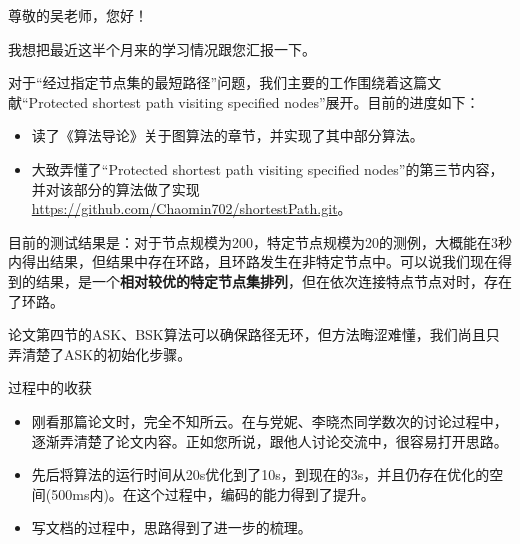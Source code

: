 \documentclass[UTF8]{ctexart}
\begin{document}
\par 尊敬的吴老师，您好！
\newline
\par 我想把最近这半个月来的学习情况跟您汇报一下。
\par 对于“经过指定节点集的最短路径”问题，我们主要的工作围绕着这篇文献“Protected shortest path visiting specified nodes”展开。目前的进度如下：
\begin{itemize}
\item 读了《算法导论》关于图算法的章节，并实现了其中部分算法。
\item 大致弄懂了“Protected shortest path visiting specified nodes”的第三节内容，并对该部分的算法做了实现
\url{https://github.com/Chaomin702/shortestPath.git}。
\end{itemize}
\par 目前的测试结果是：对于节点规模为200，特定节点规模为20的测例，大概能在3秒内得出结果，但结果中存在环路，且环路发生在非特定节点中。可以说我们现在得到的结果，是一个\textbf{相对较优的特定节点集排列}，但在依次连接特点节点对时，存在了环路。
\par 论文第四节的ASK、BSK算法可以确保路径无环，但方法晦涩难懂，我们尚且只弄清楚了ASK的初始化步骤。
\newline
\par 过程中的收获
\begin{itemize}
\item 刚看那篇论文时，完全不知所云。在与党妮、李晓杰同学数次的讨论过程中，逐渐弄清楚了论文内容。正如您所说，跟他人讨论交流中，很容易打开思路。
\item 先后将算法的运行时间从20s优化到了10s，到现在的3s，并且仍存在优化的空间(500ms内)。在这个过程中，编码的能力得到了提升。
\item 写文档的过程中，思路得到了进一步的梳理。
\end{itemize}
\end{document}

